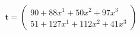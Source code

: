 \documentclass[preview]{standalone}
\begin{document}
\begin{align*}
\mathbf{t} = \begin{pmatrix}90 + 88x^{1} + 50x^{2} + 97x^{3} \\ 51 + 127x^{1} + 112x^{2} + 41x^{3}\end{pmatrix}
\end{align*}
\end{document}
